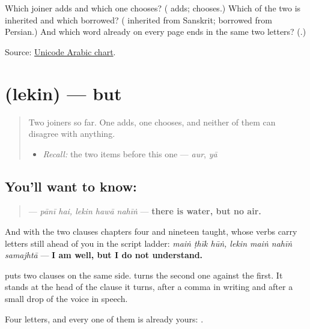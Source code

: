 \begin{tcolorbox}[breakable,colback=teal!4,colframe=teal!35!black,title={Before you move on}]
Which joiner adds and which one chooses? (\textbf{} adds; \textbf{} chooses.) Which of the two is inherited and which borrowed? (\textbf{} inherited from Sanskrit; \textbf{} borrowed from Persian.) And which word already on every page ends in the same two letters? (\textbf{}.)

Source: \href{https://www.unicode.org/charts/PDF/U0600.pdf}{Unicode Arabic chart}.
\end{tcolorbox}
\section[\texorpdfstring{\ur{لیکن} (lekin)}{لیکن (lekin)}]{ (lekin) — but}

\label{lesson:UR-C20-lekin}



\begin{quote}
Two joiners so far. One adds, one chooses, and neither of them can disagree with anything.

\begin{itemize}
\raggedright
  \item \emph{Recall:} the two items before this one — \emph{aur}, \emph{yā}
\end{itemize}
\end{quote}

\subsection*{You'll want to know: }
\begin{quote}
\textbf{    } — \emph{pānī hai, lekin hawā nahīṅ} — \textbf{there is water, but no air.}
\end{quote}

And with the two clauses chapters four and nineteen taught, whose verbs carry letters still ahead of you in the script ladder: \emph{maiṅ ṭhīk hūṅ, lekin maiṅ nahīṅ samajhtā} — \textbf{I am well, but I do not understand.}

\textbf{} puts two clauses on the same side. \textbf{} turns the second one against the first. It stands at the head of the clause it turns, after a comma in writing and after a small drop of the voice in speech.

Four letters, and every one of them is already yours: \textbf{} \textbf{} \textbf{} \textbf{}.

